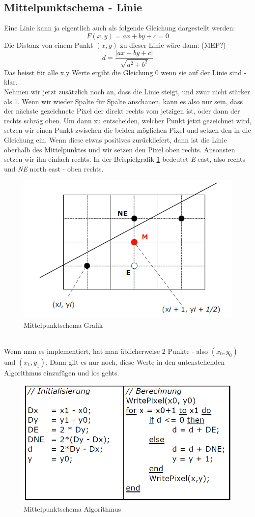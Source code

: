 \subsection{Mittelpunktschema - Linie}
Eine Linie kann ja eigentlich auch als folgende Gleichung dargestellt werden:
\begin{displaymath}
F(x,y) = ax+by+c = 0
\end{displaymath}
Die Distanz von einem Punkt \((x,y)\) zu dieser Linie wäre dann: (MEP?)
\begin{displaymath}
d = \frac{|ax+by+c|}{\sqrt{a^2+b^2}}
\end{displaymath}
Das heisst für alle x,y Werte ergibt die Gleichung 0 wenn sie auf der Linie sind - klar.\\Nehmen wir jetzt zusätzlich noch an, dass die Linie steigt, und zwar nicht stärker als 1. Wenn wir wieder Spalte für Spalte anschauen, kann es also nur sein, dass der nächste gezeichnete Pixel der direkt rechts vom jetzigen ist, oder dann der rechts schräg oben. Um dann zu entscheiden, welcher Punkt jetzt gezeichnet wird, setzen wir einen Punkt zwischen die beiden möglichen Pixel und setzen den in die Gleichung ein. Wenn diese etwas positives zurückliefert, dann ist die Linie oberhalb des Mittelpunktes und wir setzen den Pixel oben rechts. Ansonsten setzen wir ihn einfach rechts. In der Beispielgrafik \ref{fig:mittelpunktschema} bedeutet \textit{E} east, also rechts und \textit{NE} north east - oben rechts.
\begin{figure}[!ht]
	\centering
	\includegraphics[width=0.4\linewidth]{fig/mittelpunktschema}
	\caption{Mittelpunktschema Grafik}
	\label{fig:mittelpunktschema}
\end{figure}\\
Wenn man es implementiert, hat man üblicherweise 2 Punkte - also \((x_0,y_0)\) und \((x_1,y_1)\). Dann gilt es nur noch, diese Werte in den untenstehenden Algorithmus einzufügen und los gehts.
\begin{figure}[!ht]
	\centering
	\includegraphics[width=0.4\linewidth]{fig/mittelpunktschema_algo}
	\caption{Mittelpunktschema Algorithmus}
	\label{fig:mittelpunktschema_algo}
\end{figure}
